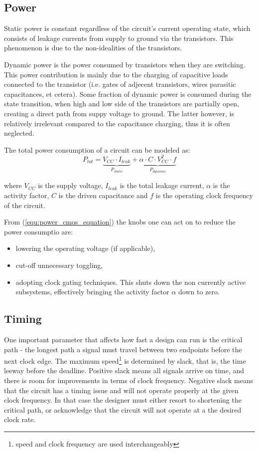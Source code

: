 \subsection{Power}
Static power is constant regardless of the circuit's current operating state, which consists of leakage currents from supply to ground via the transistors. This phenomenon is due to the non-idealities of the transistors. 

Dynamic power is the power consumed by transistors when they are switching. 
This power contribution is mainly due to the charging of capacitive loads connected to the transistor (i.e. gates of adjecent transistors, wires parasitic capacitances, et cetera). 
Some fraction of dynamic power is consumed during the state transition, when high and low side of the transistors are partially open, creating a direct path from suppy voltage to ground. The latter however, is relatively irrelevant compared to the capacitance charging, thus it is often neglected.

The total power consumption of a circuit can be modeled as:
\begin{equation}\label{equ:power_cmos_equation}
P_{tot} = \underbrace{V_{CC} \cdot I_{leak}}_{P_{static}} + \underbrace{\alpha \cdot C \cdot V_{CC}^2 \cdot f}_{P_{dynamic}}
\end{equation}

where $V_{CC}$ is the supply voltage, $I_{leak}$ is the total leakage current, $\alpha$ is the activity factor, $C$ is the driven capacitance and $f$ is the operating clock frequency of the circuit.

From (\ref{equ:power_cmos_equation}) the knobs one can act on to reduce the power consumptio are:
\begin{itemize}
\item lowering the operating voltage (if applicable),
\item cut-off unnecessary toggling,
\item adopting clock gating techniques. This shuts down the non currently active subsystems, effectively bringing the activity factor $\alpha$ down to zero.
\end{itemize}




\subsection{Timing}
One important parameter that affects how fast a design can run is the critical path - the longest path a signal must travel between two endpoints before the next clock edge. 
The maximum speed\footnote{speed and clock frequency are used interchangeably} is determined by slack, that is, the time leeway before the deadline.
Positive slack means all signals arrive on time, and there is room for improvements in terms of clock frequency. Negative slack means that the circuit has a timing issue and will not operate properly at the given clock frequency.
In that case the designer must either resort to shortening the critical path, or acknowledge that the circuit will not operate at a the desired clock rate.


